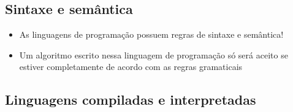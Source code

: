 \documentclass[portuguese,10pt,xcolor=table]{bredelebeamer}
\begin{document}
	\subsection{Sintaxe e semântica}
	\begin{frame}
	\begin{itemize}
		\item As linguagens de programação possuem regras de sintaxe e semântica!
		\item Um algoritmo escrito nessa linguagem de programação só será aceito se estiver completamente de acordo com as regras gramaticais
		
	\end{itemize}
	\end{frame}

	\subsection{Linguagens compiladas e interpretadas}
\end{document}
